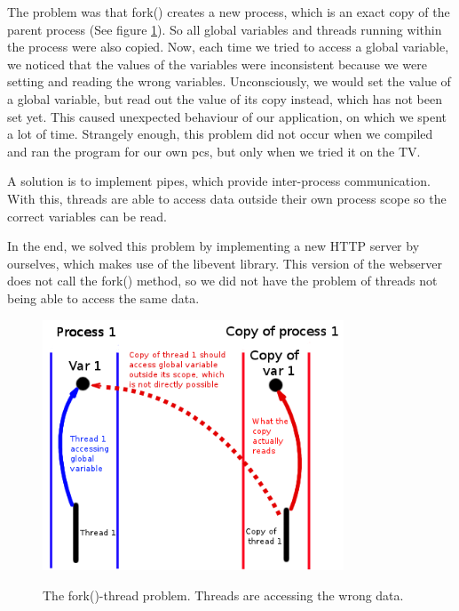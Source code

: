 The problem was that fork() creates a new process, which is an exact copy of the parent 
process (See figure \ref{fig:fork_thread}). So all global variables and threads running 
within the process were also copied. Now, each time we tried to access a global variable, we 
noticed that the values of the variables were inconsistent because we were setting and 
reading the wrong variables. Unconsciously, we would set the value of a global variable, but 
read out the value of its copy instead, which has not been set yet. This caused unexpected 
behaviour of our application, on which we spent a lot of time. Strangely enough, this problem 
did not occur when we compiled and ran the program for our own pc\textquotesingle s, but only 
when we tried it on the TV.

A solution is to implement pipes, which provide inter-process communication. With this, threads are able to access data outside their own process scope so the correct variables can be read. 

In the end, we solved this problem by implementing a new HTTP server by ourselves, which makes use of the libevent library. This version of the webserver does not call the fork() method, so we did not have the problem of threads not being able to access the same data.

\begin{center}
\begin{figure}[h]
	\centering
	\mbox{\includegraphics[width=0.8\textwidth]{Images/fork-thread.png}}
	\label{fig:fork_thread}
	\caption{The fork()-thread problem. Threads are accessing the wrong data.}
\end{figure}
\end{center}

